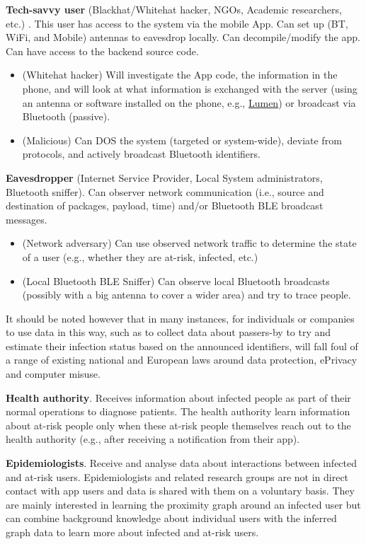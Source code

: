 \documentclass[10.8pt,a4paper]{article}
\begin{document}
\textbf{Tech-savvy user} (Blackhat/Whitehat hacker, NGOs, Academic researchers, etc.) .
This user has access to the system via the mobile App. Can set up (BT, WiFi, and Mobile)
antennas to eavesdrop locally. Can decompile/modify the app. Can have access to the
backend source code.
\begin{itemize}\itemsep0pt
\item (Whitehat hacker) Will investigate the App code, the information in the phone, and will look at what information is exchanged with the server (using an antenna or software
installed on the phone, e.g., \href{http://www.haystack.mobi}{\underline{Lumen}}) or broadcast via Bluetooth (passive).
\item (Malicious) Can DOS the system (targeted or system-wide), deviate from protocols, and actively broadcast Bluetooth identifiers.
\end{itemize}
\textbf{Eavesdropper} (Internet Service Provider, Local System administrators, Bluetooth sniffer). Can observer network communication (i.e., source and destination of packages, payload, time) and/or Bluetooth BLE broadcast messages.
\begin{itemize}
\item  (Network adversary) Can use observed network traffic to determine the state of a
user (e.g., whether they are at-risk, infected, etc.)
\item (Local Bluetooth BLE Sniffer) Can observe local Bluetooth broadcasts (possibly with
a big antenna to cover a wider area) and try to trace people.
\end{itemize}
It should be noted however that in many instances, for individuals or companies to use data in this way, such as to collect data about passers-by to try and estimate their infection status based on the announced identifiers, will fall foul of a range of existing national and European laws around data protection, ePrivacy and computer misuse.

\textbf{Health authority}. Receives information about infected people as part of their normal operations to diagnose patients. The health authority learn information about at-risk people only when these at-risk people themselves reach out to the health authority (e.g., after receiving a notification from their app).

\textbf{Epidemiologists}. Receive and analyse data about interactions between infected and at-risk users. Epidemiologists and related research groups are not in direct contact with app users and data is shared with them on a voluntary basis. They are mainly interested in learning the proximity graph around an infected user but can combine background knowledge about individual users with the inferred graph data to learn more about infected and at-risk users.
\end{document}

